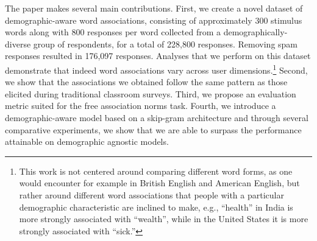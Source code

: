 \documentclass[11pt,letterpaper]{article}
\begin{document}
The paper makes several main contributions. 
First, we create a novel dataset of demographic-aware word associations, consisting of approximately 300 stimulus words along with 800 responses per word collected from  a demographically-diverse group of respondents, for a total of 228,800 responses.
Removing spam responses resulted in 176,097 responses.
Analyses that we perform on this dataset demonstrate that indeed word associations vary across user dimensions.\footnote{This work is not centered around comparing different word forms, as one would encounter for example in British English and American English, but rather around different word associations that people with a particular demographic characteristic are inclined to make, 
e.g., ``health'' in India is more strongly associated with ``wealth'', while in the United States it is more strongly associated with ``sick.''} 
Second, we show that the associations we obtained follow the same pattern as those elicited during traditional classroom surveys. Third, we propose an evaluation metric suited for the free association norms task. Fourth, we introduce a demographic-aware model based on a skip-gram architecture and through several comparative experiments, we show that we are able to surpass the performance attainable on demographic agnostic models. %

\end{document}
